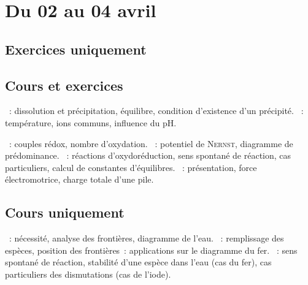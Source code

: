 \documentclass[a4paper, 11pt, final, garamond]{book}
\begin{document}
\setcounter{chapter}{22}

\chapter{Du 02 au 04 avril}

\section{Exercices uniquement}

\section{Cours et exercices}
\begin{enumerate}[label=\Roman*]
	~: dissolution et précipitation,
	équilibre, condition d'existence d'un précipité.
	~: température, ions communs,
	influence du pH.
\end{enumerate}

\begin{enumerate}[label=\Roman*]
	~: couples rédox, nombre d'oxydation.
	~: potentiel de \textsc{Nernst},
	diagramme de prédominance.
	~: réactions d'oxydoréduction, sens spontané de
	réaction, cas particuliers, calcul de constantes d'équilibres.
	~: présentation, force électromotrice, charge
	totale d'une pile.
\end{enumerate}

\section{Cours uniquement}
\begin{enumerate}[label=\Roman*]
	~: nécessité, analyse des frontières, diagramme de l'eau.
	~: remplissage des espèces, position des
	frontières~: applications sur le diagramme du fer.
	~: sens spontané de réaction, stabilité d'une espèce dans
	l'eau (cas du fer), cas particuliers des dismutations (cas de l'iode).
\end{enumerate}

\newpage
\end{document}
